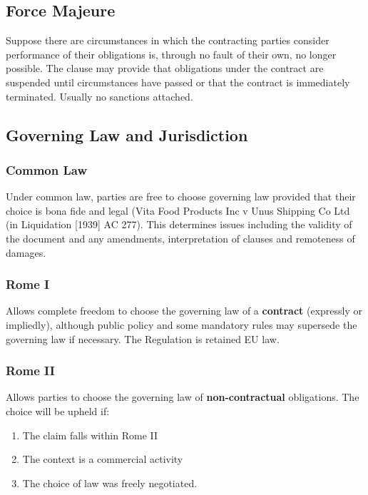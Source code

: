 \documentclass[
]{article}
\providecommand{\tightlist}{%
  \setlength{\itemsep}{0pt}\setlength{\parskip}{0pt}}
\begin{document}
\hypertarget{force-majeure}{%
\subsection{Force Majeure}\label{force-majeure}}

Suppose there are circumstances in which the contracting parties
consider performance of their obligations is, through no fault of their
own, no longer possible. The clause may provide that obligations under
the contract are suspended until circumstances have passed or that the
contract is immediately terminated. Usually no sanctions attached.

\hypertarget{governing-law-and-jurisdiction}{%
\subsection{Governing Law and
Jurisdiction}\label{governing-law-and-jurisdiction}}

\hypertarget{common-law}{%
\subsubsection{Common Law}\label{common-law}}

Under common law, parties are free to choose governing law provided that
their choice is bona fide and legal (Vita Food Products Inc v Unus
Shipping Co Ltd (in Liquidation {[}1939{]} AC 277). This determines
issues including the validity of the document and any amendments,
interpretation of clauses and remoteness of damages.

\hypertarget{rome-i}{%
\subsubsection{Rome I}\label{rome-i}}

Allows complete freedom to choose the governing law of a
\textbf{contract} (expressly or impliedly), although public policy and
some mandatory rules may supersede the governing law if necessary. The
Regulation is retained EU law.

\hypertarget{rome-ii}{%
\subsubsection{Rome II}\label{rome-ii}}

Allows parties to choose the governing law of \textbf{non-contractual}
obligations. The choice will be upheld if:

\begin{enumerate}
\tightlist
\item
  The claim falls within Rome II
\item
  The context is a commercial activity
\item
  The choice of law was freely negotiated.
\end{enumerate}
\end{document}
